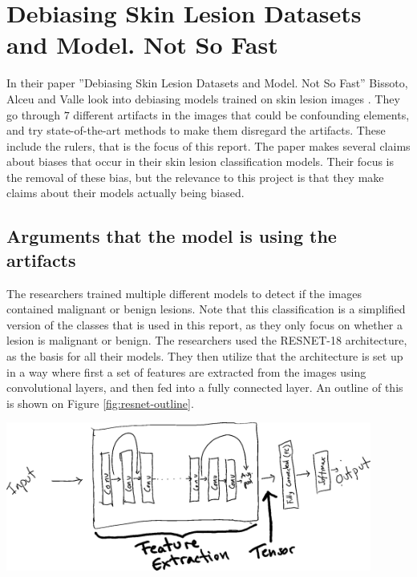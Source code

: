 \section{Debiasing Skin Lesion Datasets and Model. Not So Fast}\label{sec:debias-not-so-fast}
In their paper
''Debiasing Skin Lesion Datasets and Model. Not So Fast''
Bissoto, Alceu and Valle look into debiasing models trained on
skin lesion images \cite{debias-not-so-fast}.
They go through $7$ different artifacts in the images that could
be confounding elements, and try state-of-the-art methods to
make them disregard the artifacts.
These include the rulers, that is the focus of this report.
The paper makes several claims about biases that occur in
their skin lesion classification models.
Their focus is the removal of these bias, but the relevance to this project is that they
make claims about their models actually being biased.

\subsection{Arguments that the model is using the artifacts}
The researchers trained multiple different models to detect if the
images contained malignant or benign lesions.
Note that this classification is a simplified version of the classes
that is used in this report, as they only focus on whether a lesion is malignant or benign.
The researchers used the RESNET-18 architecture, as the basis for all their models.
They then utilize that the architecture is set up in a way where first a set of features
are extracted from the images using convolutional layers, and then fed into a fully connected layer. 
An outline of this is shown on Figure \ref{fig:resnet-outline}.

\begin{center}
    \includegraphics[width=0.9\textwidth]{images/resnet-outline.png}
    \label{fig:resnet-outline}
\end{center}

